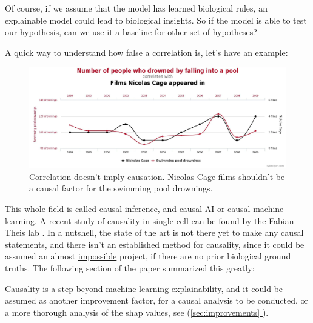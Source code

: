 \documentclass[12pt, a4paper]{article}
\newcommand*{\fullref}[1]{\hyperref[{#1}]{\ref*{#1} \nameref*{#1}}}
\begin{document}
Of course, if we assume that the model has learned biological rules, an explainable model could lead to biological insights. So if the model is able to test our hypothesis, can we use it a baseline for other set of hypotheses?

A quick way to understand how false a correlation is, let's have an example:

\begin{figure}[h!]
  \centering
  \includegraphics[width=\textwidth]{correlation_vs_causation.png}
  \caption{Correlation doesn't imply causation. Nicolas Cage films shouldn't be a causal factor for the swimming pool drownings.}
\end{figure}

This whole field is called causal inference, and causal AI or causal machine learning. A recent study of causality in single cell can be found by the Fabian Theis lab \cite{tejada-lapuertaCausalMachineLearning}. In a nutshell, the state of the art is not there yet to make any causal statements, and there isn't an established method for causality, since it could be assumed an almost \href{https://www.vanderschaar-lab.com/causal-deep-learning-research-pillar/}{impossible} project, if there are no prior biological ground truths. The following section of the paper summarized this greatly:


Causality is a step beyond machine learning explainability, and it could be assumed as another improvement factor, for a causal analysis to be conducted, or a more thorough analysis of the shap values, see (\fullref{sec:improvements}).
\end{document}
